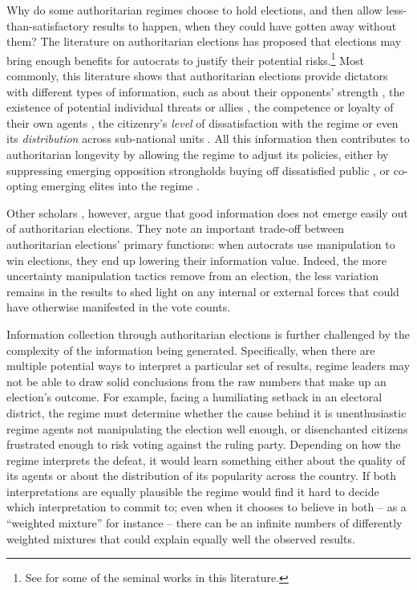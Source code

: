 \documentclass[12pt]{article}
\newcommand\fnote[1]{\footnote{\baselineskip=2\normalbaselineskip#1}}
\newcommand{\1}{\mathbbm{1}}
\begin{document}
Why do some authoritarian regimes choose to hold elections, and then allow less-than-satisfactory results to happen, when they could have gotten away without them? The literature on authoritarian elections has proposed that elections may bring enough benefits for autocrats to justify their potential risks.\fnote{See \citet{LustOkar2005, AR2005, Magaloni2006, Blaydes2010, Miller2015, Cox2009, Geddes2018} for some of the seminal works in this literature.} Most commonly, this literature shows that authoritarian elections provide dictators with different types of information, such as about their opponents' strength \citep{Geddes2018}, the existence of potential individual threats or allies \citep{LustOkar2005}, the competence or loyalty of their own agents \citep{Magaloni2006, Blaydes2010, Myagkov2009, RundlettSvolik2016}, the citizenry's \textit{level} of dissatisfaction with the regime \citep{Miller2015} or even its \textit{distribution} across sub-national units \citep{Magaloni2006, Blaydes2010}. All this information then contributes to authoritarian longevity by allowing the regime to adjust its policies, either by suppressing emerging opposition strongholds \citep{Magaloni2006, Blaydes2010} buying off dissatisfied public \citep{Miller2015, Magaloni2006}, or co-opting emerging elites into the regime \citep{LustOkar2005}.

Other scholars \citep[e.g.][]{Rozenas2016,Wintrobe2000, Morgenbesser2016}, however, argue that good information does not emerge easily out of authoritarian elections. They note an important trade-off between authoritarian elections' primary functions: when autocrats use manipulation to win elections, they end up lowering their information value. Indeed, the more uncertainty manipulation tactics remove from an election, the less variation remains in the results to shed light on any internal or external forces that could have otherwise manifested in the vote counts.

Information collection through authoritarian elections is further challenged by the complexity of the information being generated. Specifically, when there are multiple potential ways to interpret a particular set of results, regime leaders may not be able to draw solid conclusions from the raw numbers that make up an election's outcome. For example, facing a humiliating setback in an electoral district, the regime must determine whether the cause behind it is unenthusiastic regime agents not manipulating the election well enough, or disenchanted citizens frustrated enough to risk voting against the ruling party. Depending on how the regime interprets the defeat, it would learn something either about the quality of its agents or about the distribution of its popularity across the country. If both interpretations are equally plausible the regime would find it hard to decide which interpretation to commit to; even when it chooses to believe in both -- as a ``weighted mixture'' for instance -- there can be an infinite numbers of differently weighted mixtures that could explain equally well the observed results.
\end{document}
